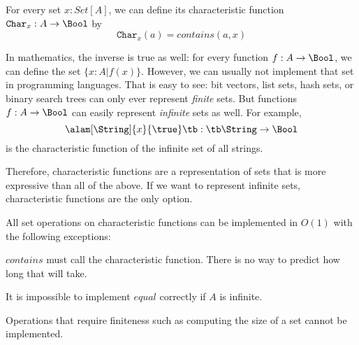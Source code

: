 For every set $x:Set[A]$, we can define its characteristic function $\mathtt{Char}_x:A\to\Bool$ by
\[\mathtt{Char}_x(a) = contains(a,x)\]

In mathematics, the inverse is true as well: for every function $f:A\to \Bool$, we can define the set $\{x: A|f(x)\}$.
However, we can usually not implement that set in programming languages.
That is easy to see: bit vectors, list sets, hash sets, or binary search trees can only ever represent \emph{finite} sets.
But functions $f:A\to\Bool$ can easily represent \emph{infinite} sets as well.
For example, \[\alam[\String]{x}{\true}\tb:\tb\String\to \Bool\] is the characteristic function of the infinite set of all strings.

Therefore, characteristic functions are a representation of sets that is more expressive than all of the above.
If we want to represent infinite sets, characteristic functions are the only option.

All set operations on characteristic functions can be implemented in $O(1)$ with the following exceptions:
\begin{compactitem}
 \item $contains$ must call the characteristic function. There is no way to predict how long that will take.
 \item It is impossible to implement $equal$ correctly if $A$ is infinite.
 \item Operations that require finiteness such as computing the size of a set cannot be implemented.
\end{compactitem}
